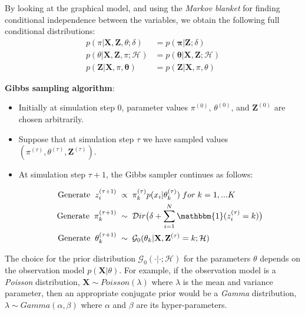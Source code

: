 By looking at the graphical model, and using the \emph{Markov blanket} for finding conditional independence between the variables, we obtain the following full conditional distributions:
\begin{equation}%
  \begin{aligned}
	p(\pi|\mathbf{X},\mathbf{Z},\theta;\delta) & = p(\mathbf{\pi} | \mathbf{Z};\delta) \\ 
	p(\theta|\mathbf{X},\mathbf{Z},\pi;\mathcal{H}) & = p(\mathbf{\theta}|\mathbf{X},\mathbf{Z};\mathcal{H})  \\
	p(\mathbf{Z}|\mathbf{X},\pi, \mathbf{\theta}) & = p(\mathbf{Z}|\mathbf{X},\pi, \theta)
  \end{aligned}
\end{equation}

\noindent\textbf{Gibbs sampling algorithm}: 
\begin{itemize}
\item {Initially at simulation step 0, parameter values $\pi^{(0)}$, $\theta^{(0)}$, and $\mathbf{Z}^{(0)}$ are chosen arbitrarily.}
\item {Suppose that at simulation step $\tau$ we have sampled values $(\pi^{(\tau)}, \theta^{(\tau)}, \mathbf{Z}^{(\tau)})$.}
\item { At simulation step $\tau + 1$, the Gibbs sampler continues as follows:

\begin{equation}%
  \begin{aligned}
    \text{Generate} \; \; z_{i}^{(\tau+1)} \; & \propto \; \pi_{k}^{(\tau)}p(x_{i}|\theta_{k}^{(\tau)}) \; for \; k=1,...K \\
    \text{Generate} \; \; \pi_{k}^{(\tau+1)} \; & \sim \; \mathcal{D}ir\big(\delta + \sum_{i=1}^{N}\mathbbm{1}(z_{i}^{(\tau)}=k)\big) \\
    \text{Generate} \; \; \theta_{k}^{(\tau+1)} \; & \sim \; \mathcal{G}_{0}(\theta_{k}| \mathbf{X}, \mathbf{Z}^{(\tau)}=k; \mathcal{H})
  \end{aligned}
\end{equation}
}
\end{itemize}

The choice for the prior distribution $\mathcal{G}_{0}(\cdot| \cdot; \mathcal{H})$ for the parameters $\theta$ depends on the observation model $p(\mathbf{X}|\theta)$. For example, if the observation model is a \emph{Poisson} distribution, \ie $\mathbf{X} \sim Poisson(\lambda)$ where $\lambda$ is the mean and variance parameter, then an appropriate conjugate prior would be a \emph{Gamma} distribution, \ie $\lambda \sim Gamma(\alpha, \beta)$ where $\alpha$ and $\beta$ are its hyper-parameters.